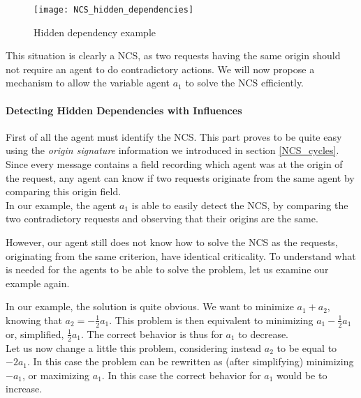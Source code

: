 \begin{figure}
\centering
\texttt{[image: NCS\_hidden\_dependencies]}
\caption{Hidden dependency example}\label{NCS_hidden_dependencies}
\end{figure}

This situation is clearly a NCS, as two requests having the same origin should not require an agent to do contradictory actions. We will now propose a mechanism to allow the variable agent $a_1$ to solve the NCS efficiently.

\paragraph*{Detecting Hidden Dependencies with Influences}
First of all the agent must identify the NCS. This part proves to be quite easy using the \emph{origin signature} information we introduced in section \ref{NCS_cycles}. Since every message contains a field recording which agent was at the origin of the request, any agent can know if two requests originate from the same agent by comparing this origin field.\\
In our example, the agent $a_1$ is able to easily detect the NCS, by comparing the two contradictory requests and observing that their origins are the same.

However, our agent still does not know how to solve the NCS as the requests, originating from the same criterion, have identical criticality. To understand what is needed for the agents to be able to solve the problem, let us examine our example again.

In our example, the solution is quite obvious. We want to minimize $a_1 + a_2$, knowing that $a_2 = -\frac{1}{2}a_1$. This problem is then equivalent to minimizing $a_1-\frac{1}{2}a_1$ or, simplified, $\frac{1}{2}a_1$. The correct behavior is thus for $a_1$ to decrease.\\
Let us now change a little this problem, considering instead $a_2$ to be equal to $ -2a_1$. In this case the problem can be rewritten as (after simplifying) minimizing $-a_1$, or maximizing $a_1$. In this case the correct behavior for $a_1$ would be to increase.

